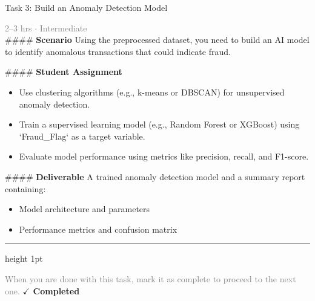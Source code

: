 \documentclass[10pt,a4paper]{article}
\begin{document}
\begin{taskbox}{Task 3: Build an Anomaly Detection Model}

    {\small \textcolor{gray}{2--3 hrs $\cdot$ Intermediate}}\\[12pt]

    \#\#\#\# \textbf{Scenario}  
Using the preprocessed dataset, you need to build an AI model to identify anomalous transactions that could indicate fraud.  

\#\#\#\# \textbf{Student Assignment}  
\begin{itemize}
    \item Use clustering algorithms (e.g., k-means or DBSCAN) for unsupervised anomaly detection.  
    \item Train a supervised learning model (e.g., Random Forest or XGBoost) using `Fraud\_Flag` as a target variable.  
    \item Evaluate model performance using metrics like precision, recall, and F1-score.  
\end{itemize}

\#\#\#\# \textbf{Deliverable}  
A trained anomaly detection model and a summary report containing:  
\begin{itemize}
    \item Model architecture and parameters  
    \item Performance metrics and confusion matrix\par
\end{itemize}

    \vspace{16pt}

    \textcolor{cardBorder}{\hrule height 1pt}\vspace{8pt}

    \small \textcolor{gray}{When you are done with this task, mark it as complete to proceed to the next one.} \hfill \textbf{\textcolor{brandDark}{$\checkmark$ Completed}}

\end{taskbox}
\end{document}
